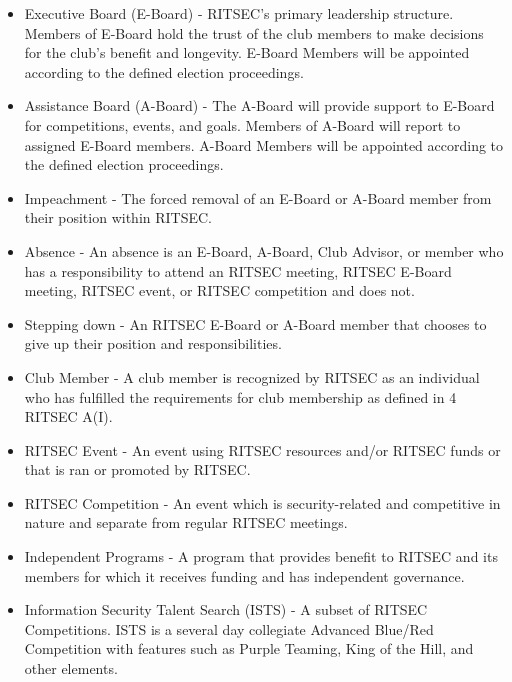 \begin{itemize}
  \item Executive Board (E-Board) - RITSEC’s primary leadership structure.
    Members of E-Board hold the trust of the club members to make decisions for
    the club's benefit and longevity. E-Board Members will be appointed
    according to the defined election proceedings.

  \item Assistance Board (A-Board) - The A-Board will provide support
    to E-Board for competitions, events, and goals. Members of A-Board will
    report to assigned E-Board members. A-Board Members will be appointed according to
    the defined election proceedings.

  \item Impeachment - The forced removal of an E-Board or A-Board member from
    their position within RITSEC.

  \item Absence - An absence is an E-Board, A-Board, Club Advisor, or member who
    has a responsibility to attend an RITSEC meeting, RITSEC E-Board meeting,
    RITSEC event, or RITSEC competition and does not.

  \item Stepping down - An RITSEC E-Board or A-Board member that chooses to
    give up their position and responsibilities.

  \item Club Member - A club member is recognized by RITSEC as an individual
    who has fulfilled the requirements for club membership as defined in
    4 RITSEC A(I).

  \item RITSEC Event - An event using RITSEC resources and/or RITSEC funds or
    that is ran or promoted by RITSEC.

  \item RITSEC Competition - An event which is security-related and competitive
    in nature and separate from regular RITSEC meetings.

  \item Independent Programs - A program that provides benefit to RITSEC and
    its members for which it receives funding and has independent governance.

  \item Information Security Talent Search (ISTS) - A subset of RITSEC 
    Competitions. ISTS is a several day collegiate
    Advanced Blue/Red Competition with features such as Purple Teaming, 
    King of the Hill, and other elements.
  

\end{itemize}
